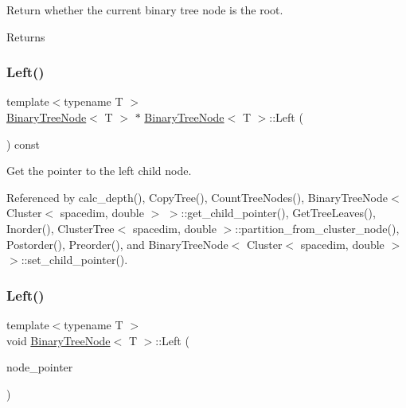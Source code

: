 Return whether the current binary tree node is the root. \begin{DoxyReturn}{Returns}

\end{DoxyReturn}
\mbox{\label{classBinaryTreeNode_af72f5be84f4ac9fa158718032cada52a}} 
\subsubsection{\texorpdfstring{Left()}{Left()}\hspace{0.1cm}{\footnotesize\ttfamily [1/2]}}
{\footnotesize\ttfamily template$<$typename T $>$ \\
\hyperlink{classBinaryTreeNode}{Binary\+Tree\+Node}$<$ T $>$ $\ast$ \hyperlink{classBinaryTreeNode}{Binary\+Tree\+Node}$<$ T $>$\+::Left (\begin{DoxyParamCaption}\item[{void}]{ }\end{DoxyParamCaption}) const}

Get the pointer to the left child node. 

Referenced by calc\+\_\+depth(), Copy\+Tree(), Count\+Tree\+Nodes(), Binary\+Tree\+Node$<$ Cluster$<$ spacedim, double $>$ $>$\+::get\+\_\+child\+\_\+pointer(), Get\+Tree\+Leaves(), Inorder(), Cluster\+Tree$<$ spacedim, double $>$\+::partition\+\_\+from\+\_\+cluster\+\_\+node(), Postorder(), Preorder(), and Binary\+Tree\+Node$<$ Cluster$<$ spacedim, double $>$ $>$\+::set\+\_\+child\+\_\+pointer().

\mbox{\label{classBinaryTreeNode_aa645c65bfa4702e04c97d70c37632a17}} 
\subsubsection{\texorpdfstring{Left()}{Left()}\hspace{0.1cm}{\footnotesize\ttfamily [2/2]}}
{\footnotesize\ttfamily template$<$typename T $>$ \\
void \hyperlink{classBinaryTreeNode}{Binary\+Tree\+Node}$<$ T $>$\+::Left (\begin{DoxyParamCaption}\item[{const \hyperlink{classBinaryTreeNode}{Binary\+Tree\+Node}$<$ T $>$ $\ast$}]{node\+\_\+pointer }\end{DoxyParamCaption})}

